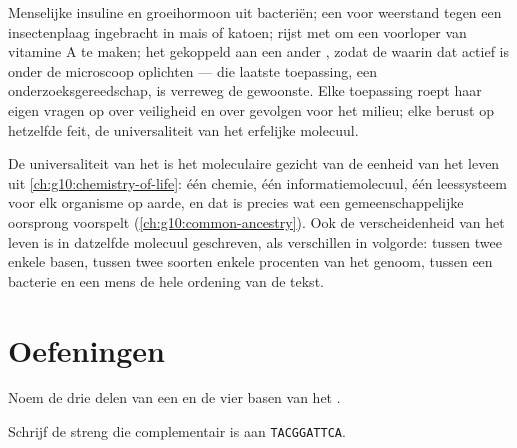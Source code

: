 \begin{example}\label{ex:g10:universal-dna:uses}
Menselijke insuline en groeihormoon uit bacteriën; een  voor
weerstand tegen een insectenplaag ingebracht in mais of katoen; rijst
met  om een voorloper van vitamine A te maken; het  gekoppeld
aan een ander , zodat de  waarin dat  actief is onder de
microscoop oplichten --- die laatste toepassing, een
onderzoeksgereedschap, is verreweg de gewoonste. Elke toepassing roept
haar eigen vragen op over veiligheid en over gevolgen voor het milieu;
elke berust op hetzelfde feit, de universaliteit van het erfelijke
molecuul.
\end{example}

\begin{remark}\label{rem:g10:universal-dna:unity}
De universaliteit van het  is het moleculaire gezicht van de eenheid
van het leven uit \cref{ch:g10:chemistry-of-life}: één chemie, één
informatiemolecuul, één leessysteem voor elk organisme op aarde, en dat
is precies wat een gemeenschappelijke oorsprong voorspelt
(\cref{ch:g10:common-ancestry}). Ook de verscheidenheid van het leven is
in datzelfde molecuul geschreven, als verschillen in volgorde: tussen
twee  enkele basen, tussen twee soorten enkele procenten van het
genoom, tussen een bacterie en een mens de hele ordening van de tekst.
\end{remark}

\section{Oefeningen}

\begin{exercise}[$\star$]\label{exo:g10:universal-dna:1}
Noem de drie delen van een  en de vier basen van het .
\end{exercise}

\begin{exercise}[$\star$]\label{exo:g10:universal-dna:2}
Schrijf de streng die complementair is aan \texttt{TACGGATTCA}.
\end{exercise}

